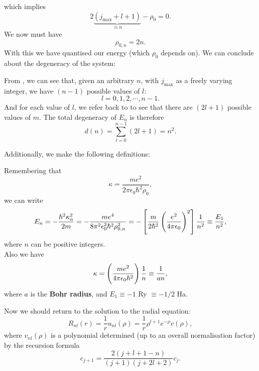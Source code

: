which implies
\begin{equation}
\label{nl_degen}
2\underbrace{(j_{\text{max}}+l+1)}_{\equiv n}-\rho_0=0.
\end{equation}
We now must have
\begin{equation}
\rho_{0,n}=2n. 
\end{equation}
With this we have quantised our energy (which $\rho_0$ depends on). 
We can conclude about the degeneracy of the system: 
\begin{prt}
From , we can see that, given an arbitrary $n$, with $j_{\text{max}}$ as a freely varying integer, we have $(n-1)$ possible values of $l$:
\begin{equation}
l=0,1,2,\cdots,n-1.
\end{equation}
And for each value of $l$, we refer back to  to see that 
there are $(2l+1)$ possible values of $m$. The total degeneracy of $E_n$ is therefore 
\begin{equation}
d(n)=\sum^{n-1}_{l=0}(2l+1)=n^2. 
\end{equation}
\end{prt}
Additionally, we make the following definitions: 
\begin{defi}
Remembering that
\begin{equation}
\kappa=\frac{me^2}{2\pi\epsilon_0\hbar^2\rho_0},
\end{equation}
we can write 
\begin{equation}
E_n=-\frac{\hbar^2\kappa_n^2}{2m}=-\frac{me^4}{8\pi^2\epsilon_0^2\hbar^2\rho_{0,n}^2}=-\left[\frac{m}{2\hbar^2}\left(\frac{e^2}{4\pi\epsilon_0} \right)^2 \right]\frac{1}{n^2}\equiv\frac{E_1}{n^2}, 
\end{equation}
where $n$ can be positive integers. \\
Also we have
\begin{equation}
\kappa=\left(\frac{me^2}{4\pi\epsilon_0\hbar^2} \right)\frac{1}{n}\equiv\frac{1}{an}, 
\end{equation}
where $a$ is the \textbf{Bohr radius}, and $E_1 \equiv -1$ Ry $\equiv -1/2$ Ha.
\end{defi}
Now we should return to the solution to the radial equation: 
\begin{equation}
R_{nl}(r)=\frac{1}{r}u_{nl}(\rho)=\frac{1}{r}\rho^{l+1}e^{-\rho}v(\rho), 
\end{equation}
where $v_{nl}(\rho)$ is a polynomial determined (up to an overall normalisation factor) by the recursion formula 
\begin{equation}
c_{j+1}=\frac{2(j+l+1-n)}{(j+1)(j+2l+2)}c_j.
\end{equation}
